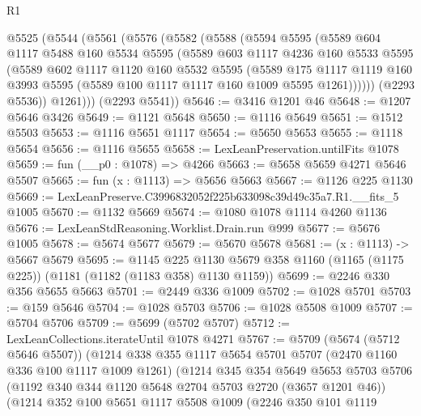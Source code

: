 \begin{lexlean}{R1}
\begin{coremodule}
  @5525
    (@5544
      (@5561
        (@5576
          (@5582
            (@5588
              (@5594
                @5595
                (@5589
                  @604
                  @1117
                  @5488
                  @160
                  @5534
                  @5595
                  (@5589
                    @603
                    @1117
                    @4236
                    @160
                    @5533
                    @5595
                    (@5589
                      @602
                      @1117
                      @1120
                      @160
                      @5532
                      @5595
                      (@5589
                        @175
                        @1117
                        @1119
                        @160
                        @3993
                        @5595
                        (@5589 @100 @1117 @1117 @160 @1009 @5595 @1261))))))
              (@2293 @5536))
            @1261)))
      (@2293 @5541))
@5646 := @3416 @1201 @46
@5648 := @1207 @5646 @3426
@5649 := @1121 @5648
@5650 := @1116 @5649
@5651 := @1512 @5503
@5653 := @1116 @5651 @1117
@5654 := @5650 @5653
@5655 := @1118 @5654
@5656 := @1116 @5655
@5658 := LexLeanPreservation.untilFits @1078
@5659 := fun (__p0 : @1078) => @4266
@5663 := @5658 @5659 @4271 @5646 @5507
@5665 := fun (x : @1113) => @5656 @5663
@5667 := @1126 @225 @1130
@5669 := LexLeanPreserve.C3996832052f225b633098c39d49c35a7.R1.__fits_5 @1005
@5670 := @1132 @5669
@5674 := @1080 @1078 @1114 @4260 @1136
@5676 := LexLeanStdReasoning.Worklist.Drain.run @999
@5677 := @5676 @1005
@5678 := @5674 @5677
@5679 := @5670 @5678
@5681 := (x : @1113) -> @5667 @5679
@5695 := @1145
    @225
    @1130
    @5679
    @358
    @1160
    (@1165 (@1175 @225))
    (@1181 (@1182 (@1183 @358) @1130 @1159))
@5699 := @2246 @330 @356 @5655 @5663
@5701 := @2449 @336 @1009
@5702 := @1028 @5701
@5703 := @159 @5646
@5704 := @1028 @5703
@5706 := @1028 @5508 @1009
@5707 := @5704 @5706
@5709 := @5699 (@5702 @5707)
@5712 := LexLeanCollections.iterateUntil @1078 @4271
@5767 := @5709
    (@5674 (@5712 @5646 @5507))
    (@1214
      @338
      @355
      @1117
      @5654
      @5701
      @5707
      (@2470 @1160 @336 @100 @1117 @1009 @1261)
      (@1214
        @345
        @354
        @5649
        @5653
        @5703
        @5706
        (@1192 @340 @344 @1120 @5648 @2704 @5703 @2720 (@3657 @1201 @46))
        (@1214
          @352
          @100
          @5651
          @1117
          @5508
          @1009
          (@2246
            @350
            @101
            @1119

\end{coremodule}
\end{lexlean}
